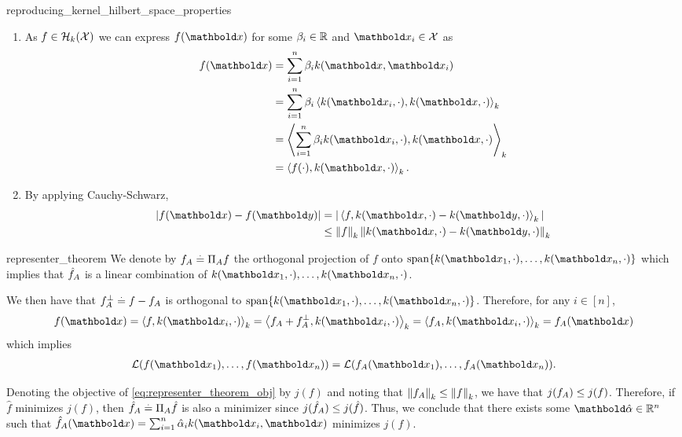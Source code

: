 \begin{solution}{reproducing_kernel_hilbert_space_properties}
  \begin{enumerate}[beginpenalty=10000]
    \item As $f \in \mathcal{H}_k(\mathcal{X})$ we can express $f(\vx)$ for some $\beta_i \in \mathbb{R}$ and $\vx_i \in \spX$ as \begin{align*}
      f(\vx) &= \sum_{i=1}^n \beta_i k(\vx, \vx_i) \\
      &= \sum_{i=1}^n \beta_i \ip{k(\vx_i,\cdot), k(\vx,\cdot)}_k \\
      &= \ip{\sum_{i=1}^n \beta_i k(\vx_i,\cdot), k(\vx,\cdot)}_k \\
      &= \ip{f(\cdot), k(\vx,\cdot)}_k.
    \end{align*}

    \item By applying Cauchy-Schwarz, \begin{align*}
      |f(\vx) - f(\vy)| &= |\ip{f, k(\vx,\cdot) - k(\vy,\cdot)}_k| \\
      &\leq \norm{f}_k \norm{k(\vx,\cdot) - k(\vy,\cdot)}_k
    \end{align*}
  \end{enumerate}
\end{solution}

\begin{solution}{representer_theorem}
  We denote by $f_{A} \overset{.}{=} \Pi_{A} f$ the orthogonal projection of $f$ onto $\mathrm{span}\{k(\vx_1, \cdot), \dots, k(\vx_n, \cdot)\}$ which implies that $\hat{f}_{A}$ is a linear combination of $k(\vx_1, \cdot), \dots, k(\vx_n, \cdot)$.

  We then have that $f_{A}^\perp \overset{.}{=} f - f_{A}$ is orthogonal to $\mathrm{span}\{k(\vx_1, \cdot), \dots, k(\vx_n, \cdot)\}$.
  Therefore, for any $i \in [n]$, \begin{align*}
    f(\vx) = \ip{f, k(\vx_i, \cdot)}_k = \ip{f_{\sA} + f_{\sA}^\perp, k(\vx_i, \cdot)}_k = \ip{f_{\sA}, k(\vx_i, \cdot)}_k = f_{\sA}(\vx)
  \end{align*} which implies \begin{align*}
    \spL(f(\vx_1), \dots, f(\vx_n)) = \spL(f_{\sA}(\vx_1), \dots, f_{\sA}(\vx_n)).
  \end{align*}

  Denoting the objective of \cref{eq:representer_theorem_obj} by $j(f)$ and noting that ${\norm{f_{\sA}}_k \leq \norm{f}_k}$, we have that $j(f_{A}) \leq j(f)$.
  Therefore, if $\hat{f}$ minimizes $j(f)$, then ${\hat{f}_{A} \overset{.}{=} \Pi_{A} \hat{f}}$ is also a minimizer since $j(\hat{f}_{A}) \leq j(\hat{f})$.
  Thus, we conclude that there exists some $\valphahat \in \R^n$ such that $\hat{f}_{\sA}(\vx) = \sum_{i=1}^n \hat{\alpha}_i k(\vx_i, \vx)$ minimizes $j(f)$.
\end{solution}

